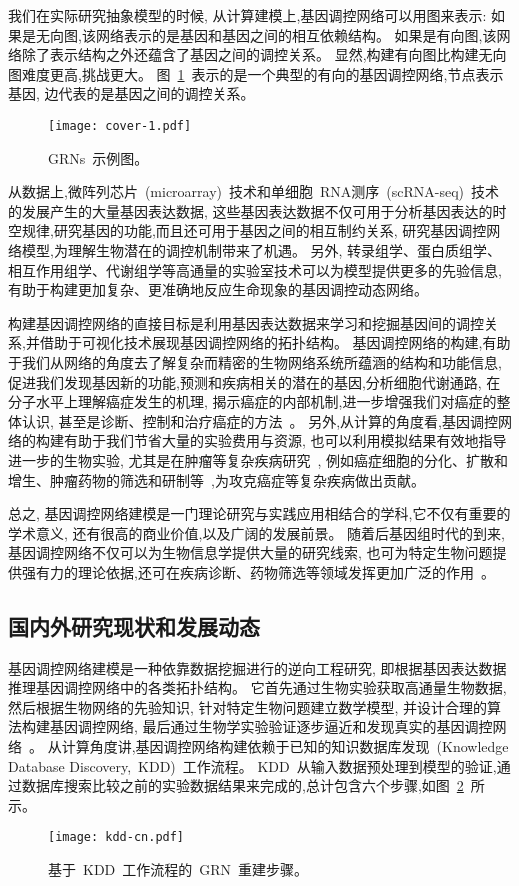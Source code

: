 我们在实际研究抽象模型的时候, 从计算建模上,基因调控网络可以用图来表示:
如果是无向图,该网络表示的是基因和基因之间的相互依赖结构。
如果是有向图,该网络除了表示结构之外还蕴含了基因之间的调控关系。
显然,构建有向图比构建无向图难度更高,挑战更大。
图~\ref{cover-1}~表示的是一个典型的有向的基因调控网络,节点表示基因, 边代表的是基因之间的调控关系。
\begin{figure}[!htbp]
    \centering
    \texttt{[image: cover-1.pdf]}
    \caption{GRNs~示例图。}
    \label{cover-1}
\end{figure}

从数据上,微阵列芯片~(microarray)~技术和单细胞~RNA测序~(scRNA-seq)~技术的发展产生的大量基因表达数据,
这些基因表达数据不仅可用于分析基因表达的时空规律,研究基因的功能,而且还可用于基因之间的相互制约关系,
研究基因调控网络模型,为理解生物潜在的调控机制带来了机遇。
另外, 转录组学、蛋白质组学、相互作用组学、代谢组学等高通量的实验室技术可以为模型提供更多的先验信息,
有助于构建更加复杂、更准确地反应生命现象的基因调控动态网络。

构建基因调控网络的直接目标是利用基因表达数据来学习和挖掘基因间的调控关系,并借助于可视化技术展现基因调控网络的拓扑结构。
基因调控网络的构建,有助于我们从网络的角度去了解复杂而精密的生物网络系统所蕴涵的结构和功能信息,
促进我们发现基因新的功能,预测和疾病相关的潜在的基因\cite{lee2009computational},分析细胞代谢通路,
在分子水平上理解癌症发生的机理,
揭示癌症的内部机制,进一步增强我们对癌症的整体认识,
甚至是诊断、控制和治疗癌症的方法~\cite{kreeger2009cancer,yan2016biological}。
另外,从计算的角度看,基因调控网络的构建有助于我们节省大量的实验费用与资源,
也可以利用模拟结果有效地指导进一步的生物实验,
尤其是在肿瘤等复杂疾病研究~\cite{boyle2017expanded},
例如癌症细胞的分化、扩散和增生、肿瘤药物的筛选和研制等~\cite{hurley2011gene},为攻克癌症等复杂疾病做出贡献。

总之, 基因调控网络建模是一门理论研究与实践应用相结合的学科,它不仅有重要的学术意义,
还有很高的商业价值,以及广阔的发展前景。
随着后基因组时代的到来,基因调控网络不仅可以为生物信息学提供大量的研究线索,
也可为特定生物问题提供强有力的理论依据,还可在疾病诊断、药物筛选等领域发挥更加广泛的作用~\cite{kreeger2009cancer}。

\subsection{国内外研究现状和发展动态}

基因调控网络建模是一种依靠数据挖掘进行的逆向工程研究, 即根据基因表达数据推理基因调控网络中的各类拓扑结构。
它首先通过生物实验获取高通量生物数据, 然后根据生物网络的先验知识, 针对特定生物问题建立数学模型, 
并设计合理的算法构建基因调控网络, 最后通过生物学实验验证逐步逼近和发现真实的基因调控网络~\cite{sima2009inference}。
从计算角度讲,基因调控网络构建依赖于已知的知识数据库发现~(Knowledge Database Discovery,~KDD)~工作流程。
KDD~从输入数据预处理到模型的验证,通过数据库搜索比较之前的实验数据结果来完成的,总计包含六个步骤,如图~\ref{cover-3}~所示。
\begin{figure}[!htbp]
    \centering
    \texttt{[image: kdd-cn.pdf]}
    \caption{基于~KDD~工作流程的~GRN~重建步骤。}
    \label{cover-3}
\end{figure}

